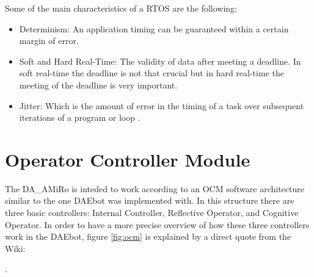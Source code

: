 \documentclass[12pt]{report}%
\begin{document}
Some of the main characteristics of a RTOS are the following:

\begin{itemize}
\item Determinism: An application timing can be guaranteed within a certain margin of error.
\item Soft and Hard Real-Time: The validity of data after meeting a deadline. In soft real-time the deadline is not that crucial but in hard real-time the meeting of the deadline is very important.
\item Jitter: Which is the amount of error in the timing of a task over subsequent iterations of a program or loop \cite{whatisRTOS}.
\end{itemize}

\section{Operator Controller Module}

The DA\_AMiRo is inteded to work according to an OCM \cite{ocmAuto} software architecture similar to the one DAEbot was implemented with. In this structure there are three basic controllers: Internal Controller, Reflective Operator, and Cognitive Operator. In order to have a more precise overview of how these three controllers work in the DAEbot, figure \ref{fig:ocm} is explained by a direct quote from the Wiki:

\cite{Wiki}.
\end{document}
